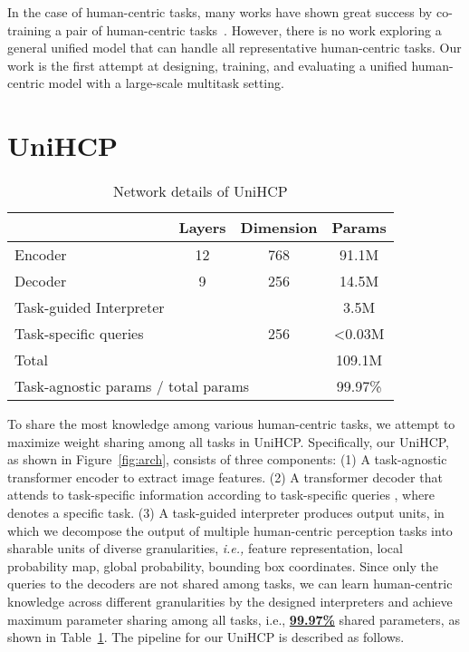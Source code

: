 \documentclass[10pt,twocolumn,letterpaper]{article}
\begin{document}
In the case of human-centric tasks, many works have shown great success by co-training a pair of human-centric tasks~\cite{su2017multi, khamis2014joint, liang2018look, tian2015pedestrian, zhang2019pose2seg, nie2018mutual,xu2022fashionformer,lin2018multi,kalayeh2018human}. However, there is no work exploring a general unified model that can handle all representative human-centric tasks. Our work is the first attempt at designing, training, and evaluating a unified human-centric model with a large-scale multitask setting.














\section{UniHCP}
\label{sec:unihcp}
\begin{table}[t]
  \centering
  \footnotesize
  \caption{Network details of UniHCP}
    \begin{tabular}{lccc}
    \toprule
          & \multicolumn{1}{l}{Layers} & \multicolumn{1}{l}{Dimension} & Params \\
    \midrule
    Encoder & 12    & 768   & 91.1M \\
    Decoder & 9     & 256   & 14.5M \\
    Task-guided Interpreter &       &       & 3.5M \\
    \midrule
    Task-specific queries &       & 256   & \textless{}0.03M \\
    \midrule
    Total  &       &       & 109.1M \\
    \multicolumn{3}{l}{Task-agnostic params / total params}        & 99.97\% \\
    \bottomrule
    \end{tabular}\label{tab:addlabel}\end{table}To share the most knowledge among various human-centric tasks, we attempt to maximize weight sharing among all tasks in UniHCP. Specifically, our UniHCP, as shown in Figure~\ref{fig:arch}, consists of three components: (1) A task-agnostic transformer encoder  to extract image features. (2) A transformer decoder  that attends to task-specific information according to task-specific queries , where  denotes a specific task. (3) A task-guided interpreter  produces output units, in which we decompose the output of multiple human-centric perception tasks into sharable units of diverse granularities, \emph{i.e.,} feature representation, local probability map, global probability, bounding box coordinates. Since only the queries to the decoders are not shared among tasks, we can learn human-centric knowledge across different granularities by the designed interpreters and achieve maximum parameter sharing among all tasks, i.e., \underline{\textbf{99.97\%}} shared parameters, as shown in Table~\ref{tab:addlabel}. The pipeline for our UniHCP is described as follows.
\end{document}
